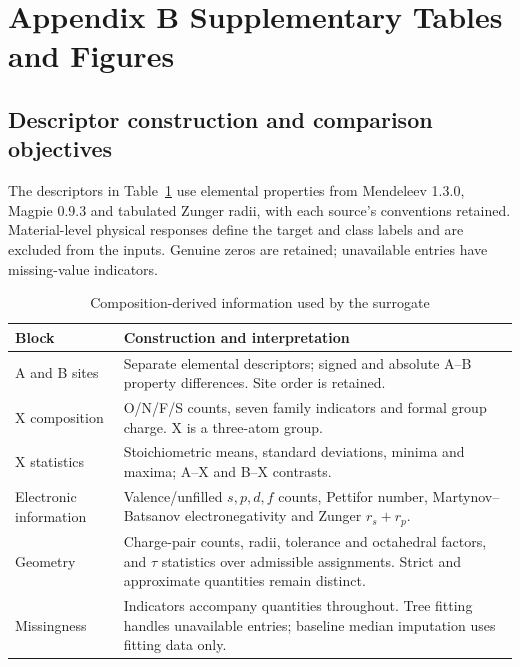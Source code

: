 \section*{ Appendix B Supplementary Tables and Figures}
\setcounter{subsection}{0}
\renewcommand{\thesubsection}{B.\arabic{subsection}}
\renewcommand{\theHsubsection}{B.\arabic{subsection}}
\setcounter{figure}{0}
\renewcommand{\thefigure}{B.\arabic{figure}}
\renewcommand{\theHfigure}{B.\arabic{figure}}
\setcounter{table}{0}
\renewcommand{\thetable}{B.\arabic{table}}
\renewcommand{\theHtable}{B.\arabic{table}}

\subsection{Descriptor construction and comparison objectives}\label{app:descriptors}
The descriptors in Table~\ref{tab:descriptors} use elemental properties from Mendeleev 1.3.0, Magpie 0.9.3 and tabulated Zunger radii, with each source's conventions retained. Material-level physical responses define the target and class labels and are excluded from the inputs. Genuine zeros are retained; unavailable entries have missing-value indicators.
\par
\begin{table}[H]
\centering
\caption{Composition-derived information used by the surrogate}\label{tab:descriptors}
\begin{tabularx}{\linewidth}{@{}l X@{}}
\toprule
Block & Construction and interpretation\\
\midrule
A and B sites & Separate elemental descriptors; signed and absolute A--B property differences. Site order is retained.\\
X composition & O/N/F/S counts, seven family indicators and formal group charge. X is a three-atom group.\\
X statistics & Stoichiometric means, standard deviations, minima and maxima; A--X and B--X contrasts.\\
Electronic information & Valence/unfilled $s,p,d,f$ counts, Pettifor number, Martynov--Batsanov electronegativity and Zunger $r_s+r_p$.\\
Geometry & Charge-pair counts, radii, tolerance and octahedral factors, and $\tau$ statistics over admissible assignments. Strict and approximate quantities remain distinct.\\
Missingness & Indicators accompany quantities throughout. Tree fitting handles unavailable entries; baseline median imputation uses fitting data only.\\
\bottomrule
\end{tabularx}
\end{table}
\par

